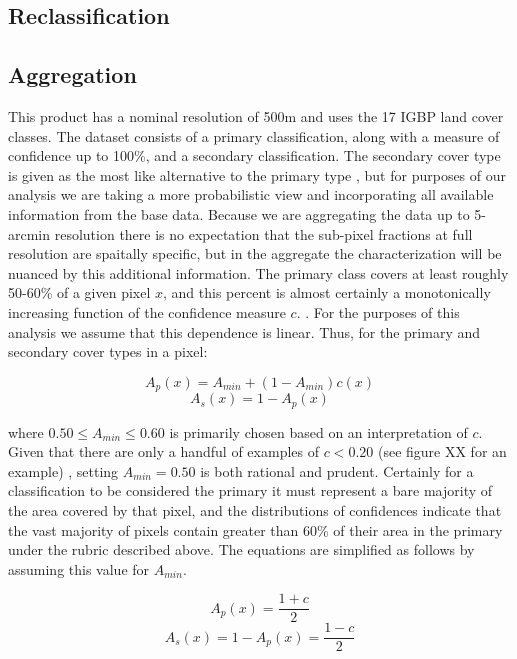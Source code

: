 \subsection{Reclassification}
\label{sec:mlct-reclass}


\subsection{Aggregation}
\label{sec:mlct-aggr}

This product has a nominal resolution of 500m and uses the 17 IGBP
land cover classes. The dataset consists of a primary classification,
along with a measure of confidence up to 100\%, and a secondary
classification.  The secondary cover type is given as the most like
alternative to the primary type \citep{Friedl2010}, but for purposes
of our analysis we are taking a more probabilistic view and
incorporating all available information from the base data.  Because
we are aggregating the data up to 5-arcmin resolution there is no
expectation that the sub-pixel fractions at full resolution are
spaitally specific, but in the aggregate the characterization will be
nuanced by this additional information.  The primary class covers at
least roughly 50-60\% of a given pixel $x$, and this percent is almost
certainly a monotonically increasing function of the confidence
measure $c$.  .  For the purposes of this
analysis we assume that this dependence is linear. Thus, for the
primary and secondary cover types in a pixel:

$$
A_p(x) = A_{min} + (1 - A_{min}) c(x)
$$
$$
A_s(x) = 1 - A_p(x)
$$

where $0.50 \le A_{min} \le 0.60$ is primarily chosen based on an
interpretation of $c$.  Given that there are only a handful of
examples of $c < 0.20$ (see figure XX for an example) , setting $A_{min} =
0.50$ is both rational and prudent.  Certainly for a classification to
be considered the primary it must represent a bare majority of the
area covered by that pixel, and the distributions of confidences
indicate that the vast majority of pixels contain greater than 60\% of
their area in the primary under the rubric described above. The
equations are simplified as follows by assuming this value for
$A_{min}$.

$$
A_p(x) = \dfrac{1 + c}{2}
$$
$$
A_s(x) = 1 - A_p(x) = \dfrac{1-c}{2}
$$

